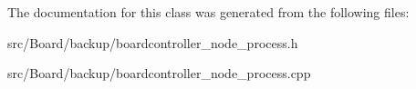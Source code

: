 The documentation for this class was generated from the following files\+:\begin{DoxyCompactItemize}
\item 
src/\+Board/backup/boardcontroller\+\_\+node\+\_\+process.\+h\item 
src/\+Board/backup/boardcontroller\+\_\+node\+\_\+process.\+cpp\end{DoxyCompactItemize}

